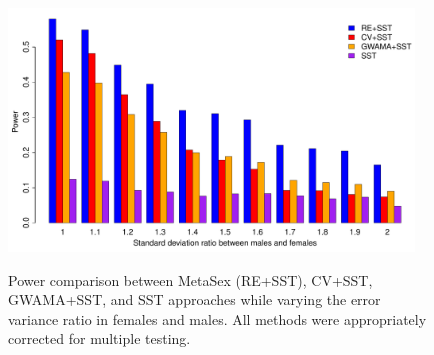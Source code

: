 \documentclass[11pt]{article}
\begin{document}
\begin{figure}[h]
\centering
{\includegraphics[width=0.96\textwidth]{../Figures/Fig3/power19_cv_res_CHL.pdf}}
\caption{ Power comparison between MetaSex (RE+SST), CV+SST, GWAMA+SST,
and SST approaches while varying 
the error variance ratio in females and males. 
All methods were appropriately corrected for multiple testing.
}
\label{power_res}
\end{figure}
\end{document}
